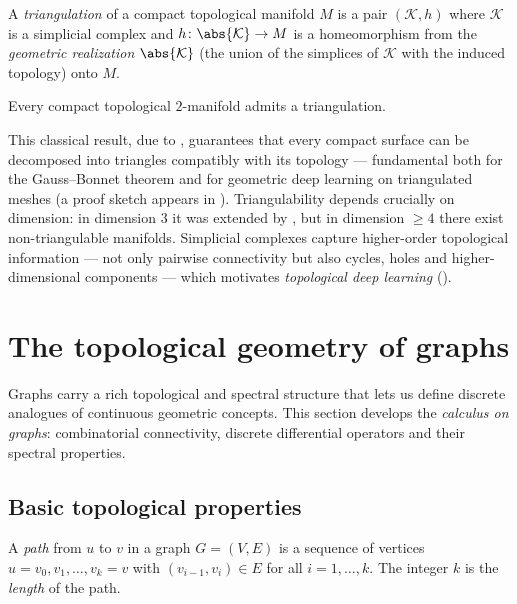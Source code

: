 \begin{definition}[Triangulation]
\label{def:graphs:triangulation}
A \emph{triangulation} of a compact topological manifold $M$ is a pair
$(\mathcal{K}, h)$ where $\mathcal{K}$ is a simplicial complex and
$h \colon \abs{\mathcal{K}} \to M$ is a homeomorphism from the
\emph{geometric realization} $\abs{\mathcal{K}}$ (the union of the simplices of
$\mathcal{K}$ with the induced topology) onto $M$.
\end{definition}

\begin{theorem}[Radó]
\label{thm:graphs:rado}
Every compact topological $2$-manifold admits a triangulation.
\end{theorem}

This classical result, due to \citet{rado1925aufgabe}, guarantees that every
compact surface can be decomposed into triangles compatibly with its topology ---
fundamental both for the Gauss--Bonnet theorem and for geometric deep learning on
triangulated meshes (a proof sketch appears in ). Triangulability
depends crucially on dimension: in dimension $3$ it was extended by
\citet{moise1977geometric}, but in dimension $\ge 4$ there exist non-triangulable
manifolds. Simplicial complexes capture higher-order topological information ---
not only pairwise connectivity but also cycles, holes and higher-dimensional
components --- which motivates \emph{topological deep learning}
().

\section{The topological geometry of graphs}
\label{sec:graphs:topology}

Graphs carry a rich topological and spectral structure that lets us define
discrete analogues of continuous geometric concepts. This section develops the
\emph{calculus on graphs}: combinatorial connectivity, discrete differential
operators and their spectral properties.

\subsection{Basic topological properties}
\label{sec:graphs:basic-topology}

\begin{definition}
\label{def:graphs:path}
A \emph{path} from $u$ to $v$ in a graph $G = (V, E)$ is a sequence of vertices
$u = v_0, v_1, \dots, v_k = v$ with $(v_{i-1}, v_i) \in E$ for all
$i = 1, \dots, k$. The integer $k$ is the \emph{length} of the path.
\end{definition}

